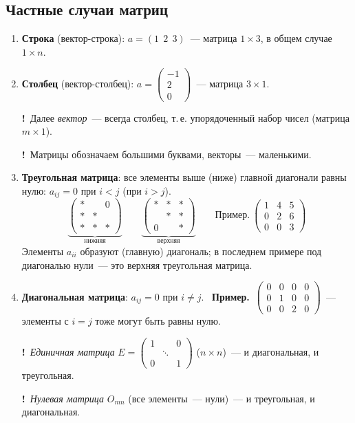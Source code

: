 \documentclass[a4paper,11pt]{article}
\newcommand{\imp}{\textbf{\color{red!70!black}!}\ }
\newcommand{\prim}{\textbf{Пример.}\ }
\begin{document}
\subsection{Частные случаи матриц}
\begin{enumerate}[label=\arabic*)]
\item \textbf{Строка} (вектор-строка): $a=(1\ \ 2\ \ 3)$~--- матрица $1\times3$, в общем случае $1\times n$.
\item \textbf{Столбец} (вектор-столбец): $a=\begin{pmatrix}-1\\2\\0\end{pmatrix}$~--- матрица $3\times1$.

\imp Далее \emph{вектор}~--- всегда столбец, т.\,е. упорядоченный набор чисел (матрица $m\times1$).

\imp Матрицы обозначаем большими буквами, векторы~--- маленькими.

\item \textbf{Треугольная матрица}: все элементы выше (ниже) главной диагонали равны нулю:
$a_{ij}=0$ при $i<j$ (при $i>j$).
\[
\underbrace{\begin{pmatrix}\ast&&0\\ \ast&\ast&\\ \ast&\ast&\ast\end{pmatrix}}_{\text{нижняя}}
\qquad
\underbrace{\begin{pmatrix}\ast&\ast&\ast\\ &\ast&\ast\\ 0&&\ast\end{pmatrix}}_{\text{верхняя}}
\qquad
\prim \begin{pmatrix}1&4&5\\0&2&6\\0&0&3\end{pmatrix}
\]
Элементы $a_{ii}$ образуют (главную) диагональ; в последнем примере под диагональю нули~---
это верхняя треугольная матрица.

\item \textbf{Диагональная матрица}: $a_{ij}=0$ при $i\ne j$. \
\prim $\begin{pmatrix}0&0&0&0\\0&1&0&0\\0&0&2&0\end{pmatrix}$~--- элементы с $i=j$ тоже могут быть равны нулю.

\imp \emph{Единичная матрица} $E=\begin{pmatrix}1&&0\\&\ddots&\\0&&1\end{pmatrix}$ ($n\times n$)~---
и диагональная, и треугольная.

\imp \emph{Нулевая матрица} $O_{mn}$ (все элементы~--- нули)~--- и треугольная, и диагональная.
\end{enumerate}
\end{document}
